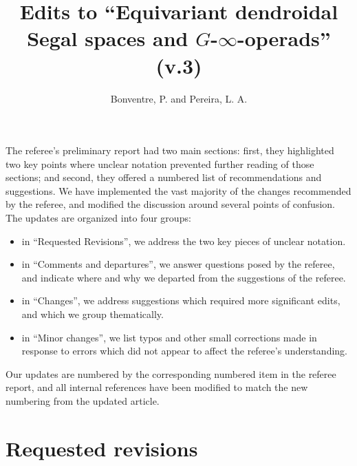 \documentclass{article}
\begin{document}
 
 
\title{Edits to ``Equivariant dendroidal Segal spaces and $G$-$\infty$-operads'' (v.3)
\\[12pt]} %
 
\author{Bonventre, P. and Pereira, L. A.}
 
\maketitle
 
The referee's preliminary report had two main sections:
first, they highlighted two key points where unclear notation prevented further reading of those sections; %
and second, they offered a numbered list of recommendations and suggestions.
We have implemented the vast majority of the changes recommended by the referee, and modified the discussion around several points of confusion.
The updates are organized into four groups:
\begin{itemize}
\item in ``Requested Revisions'', we address the two key pieces of unclear notation.
\item in ``Comments and departures'', we answer questions posed by the referee, and indicate where and why we departed from the suggestions of the referee.
\item in ``Changes'', we address suggestions which required more significant edits,
and which we group thematically.
\item in ``Minor changes'', we list typos and other small corrections made in response to errors which did not appear to affect the referee's understanding.
\end{itemize}

Our updates are numbered by the corresponding numbered item in the referee report,
and all internal references have been modified to match the new numbering from the updated article.



\section{Requested revisions}

\end{document}
